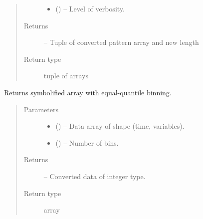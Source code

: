 \documentclass[letterpaper,10pt,english]{sphinxmanual}
\begin{document}
\begin{fulllineitems}
\begin{quote}
\begin{description}
\begin{itemize}
\item {} 
 (\sphinxstyleliteralemphasis{, }\sphinxstyleliteralemphasis{ (}\sphinxstyleliteralemphasis{)}\sphinxstyleliteralemphasis{}) -- Level of verbosity.

\end{itemize}

\item[{Returns}] \leavevmode
{} -- Tuple of converted pattern array and new length

\item[{Return type}] \leavevmode
tuple of arrays

\end{description}\end{quote}

\end{fulllineitems}


\begin{fulllineitems}
\label{\detokenize{index:tigramite.data_processing.quantile_bin_array}}
Returns symbolified array with equal-quantile binning.
\begin{quote}\begin{description}
\item[{Parameters}] \leavevmode\begin{itemize}
\item {} 
 () -- Data array of shape (time, variables).

\item {} 
 (\sphinxstyleliteralemphasis{, }\sphinxstyleliteralemphasis{ (}\sphinxstyleliteralemphasis{)}\sphinxstyleliteralemphasis{}) -- Number of bins.

\end{itemize}

\item[{Returns}] \leavevmode
{} -- Converted data of integer type.

\item[{Return type}] \leavevmode
array

\end{description}\end{quote}

\end{fulllineitems}
\end{document}
